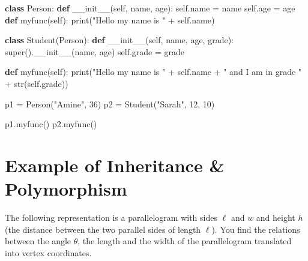 \documentclass[11pt]{article}
\newenvironment{Shaded}{}{}
\newcommand{\KeywordTok}[1]{\textcolor[rgb]{0.00,0.44,0.13}{\textbf{{#1}}}}
\newcommand{\DecValTok}[1]{\textcolor[rgb]{0.25,0.63,0.44}{{#1}}}
\newcommand{\StringTok}[1]{\textcolor[rgb]{0.25,0.44,0.63}{{#1}}}
\newcommand{\FunctionTok}[1]{\textcolor[rgb]{0.02,0.16,0.49}{{#1}}}
\newcommand{\NormalTok}[1]{{#1}}
\newcommand{\VariableTok}[1]{\textcolor[rgb]{0.10,0.09,0.49}{{#1}}}
\newcommand{\OperatorTok}[1]{\textcolor[rgb]{0.40,0.40,0.40}{{#1}}}
\newcommand{\BuiltInTok}[1]{{#1}}
\begin{document}
\begin{Shaded}
\begin{Highlighting}[]
\KeywordTok{class}\NormalTok{ Person:}
    \KeywordTok{def} \FunctionTok{\_\_init\_\_}\NormalTok{(}\VariableTok{self}\NormalTok{, name, age):}
        \VariableTok{self}\NormalTok{.name }\OperatorTok{=}\NormalTok{ name}
        \VariableTok{self}\NormalTok{.age }\OperatorTok{=}\NormalTok{ age}
    \KeywordTok{def}\NormalTok{ myfunc(}\VariableTok{self}\NormalTok{):}
        \BuiltInTok{print}\NormalTok{(}\StringTok{"Hello my name is "} \OperatorTok{+} \VariableTok{self}\NormalTok{.name)}

\KeywordTok{class}\NormalTok{ Student(Person):}
    \KeywordTok{def} \FunctionTok{\_\_init\_\_}\NormalTok{(}\VariableTok{self}\NormalTok{, name, age, grade):}
        \BuiltInTok{super}\NormalTok{().}\FunctionTok{\_\_init\_\_}\NormalTok{(name, age)}
        \VariableTok{self}\NormalTok{.grade }\OperatorTok{=}\NormalTok{ grade}

    \KeywordTok{def}\NormalTok{ myfunc(}\VariableTok{self}\NormalTok{):}
        \BuiltInTok{print}\NormalTok{(}\StringTok{"Hello my name is "} \OperatorTok{+} \VariableTok{self}\NormalTok{.name }\OperatorTok{+} \StringTok{" and I am in grade "} \OperatorTok{+} \BuiltInTok{str}\NormalTok{(}\VariableTok{self}\NormalTok{.grade))}

\NormalTok{p1 }\OperatorTok{=}\NormalTok{ Person(}\StringTok{"Amine"}\NormalTok{, }\DecValTok{36}\NormalTok{)}
\NormalTok{p2 }\OperatorTok{=}\NormalTok{ Student(}\StringTok{"Sarah"}\NormalTok{, }\DecValTok{12}\NormalTok{, }\DecValTok{10}\NormalTok{)}

\NormalTok{p1.myfunc()}
\NormalTok{p2.myfunc()}
\end{Highlighting}
\end{Shaded}


\section{Example of Inheritance \& Polymorphism}\label{example-of-inheritance-polymorphism}

The following representation is a parallelogram with sides \(\ell\) and \(w\) and height \(h\) (the distance between the two parallel sides of length \(\ell\)).
You find the relations between the angle $\theta$, the length and the width of the parallelogram translated into vertex coordinates.
\end{document}
